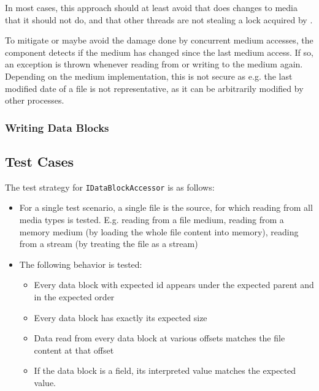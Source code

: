 In most cases, this approach should at least avoid that \LibName{} does changes to media that it should not do, and that other threads are not stealing a lock acquired by \LibName{}.

To mitigate or maybe avoid the damage done by concurrent medium accesses, the \COMPmedia{} component detects if the medium has changed since the last medium access. If so, an exception is thrown whenever reading from or writing to the medium again. Depending on the medium implementation, this is not secure as e.g. the last modified date of a file is not representative, as it can be arbitrarily modified by other processes.


\subsubsection{Writing Data Blocks}
\label{sec:ReadingDataBlocks}


\subsection{Test Cases}
\label{sec:TestCasesCOMPdataPartManagement}

The test strategy for \texttt{IDataBlockAccessor} is as follows:
\begin{itemize}
	\item For a single test scenario, a single file is the source, for which reading from all media types is tested. E.g. reading from a file medium, reading from a memory medium (by loading the whole file content into memory), reading from a stream (by treating the file as a stream)
	\item The following behavior is tested:
	\begin{itemize}
		\item Every data block with expected id appears under the expected parent and
		in the expected order
		\item Every data block has exactly its expected size
		\item Data read from every data block at various offsets matches the file content at that 	offset
		\item If the data block is a field, its interpreted value matches the expected value.
	\end{itemize}
\end{itemize}

